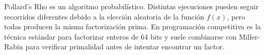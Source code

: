 
Pollard's Rho es un algoritmo probabilístico. Distintas ejecuciones pueden seguir recorridos diferentes debido a la elección aleatoria de la función \(f(x)\), pero todas producen la misma factorización prima. En programación competitiva es la técnica estándar para factorizar enteros de 64 bits y suele combinarse con Miller-Rabin para verificar primalidad antes de intentar encontrar un factor.